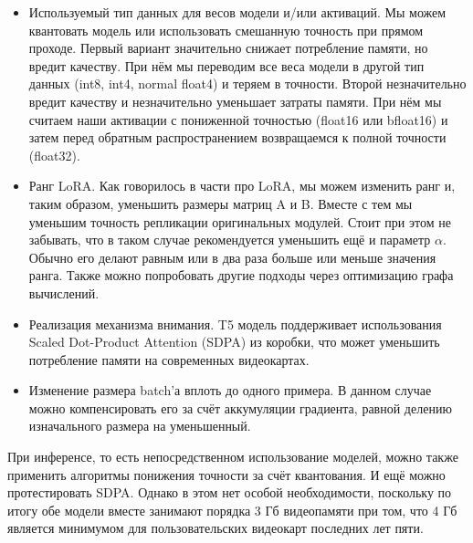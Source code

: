 \begin{itemize}
  \item Используемый тип данных для весов модели и/или активаций.
  Мы можем квантовать модель\cite{lin2024awq} или использовать смешанную точность при прямом проходе\cite{micikevicius2017mixed}.
  Первый вариант значительно снижает потребление памяти, но вредит качеству.
  При нём мы переводим все веса модели в другой тип данных (int8, int4, normal float4) и теряем в точности.
  Второй незначительно вредит качеству и незначительно уменьшает затраты памяти.
  При нём мы считаем наши активации с пониженной точностью (float16 или bfloat16\cite{kalamkar2019study}) и затем перед обратным распространением возвращаемся к полной точности (float32).
  \item Ранг LoRA.
  Как говорилось в части про LoRA, мы можем изменить ранг и, таким образом, уменьшить размеры матриц A и B.
  Вместе с тем мы уменьшим точность репликации оригинальных модулей.
  Стоит при этом не забывать, что в таком случае рекомендуется уменьшить ещё и параметр $\alpha$.
  Обычно его делают равным или в два раза больше или меньше значения ранга.
  Также можно попробовать другие подходы через оптимизацию графа вычислений\cite{cherniuk2023run}.
  \item Реализация механизма внимания.
  T5 модель поддерживает использования Scaled Dot-Product Attention (SDPA)\cite{dao2022flashattention,dao2023flashattention} из коробки, что может уменьшить потребление памяти на современных видеокартах.
  \item Изменение размера batch'а вплоть до одного примера.
  В данном случае можно компенсировать его за счёт аккумуляции градиента, равной делению изначального размера на уменьшенный.
\end{itemize}

При инференсе, то есть непосредственном использование моделей, можно также применить алгоритмы понижения точности за счёт квантования.
И ещё можно протестировать SDPA.
Однако в этом нет особой необходимости, поскольку по итогу обе модели вместе занимают порядка 3 Гб видеопамяти при том, что 4 Гб является минимумом для пользовательских видеокарт последних лет пяти.

